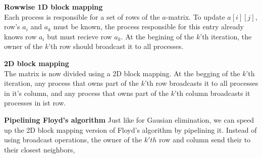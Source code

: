 \documentclass[a4paper,10pt,twoside,twocolumn]{article}
\renewcommand{\(}{\left(}
\renewcommand{\)}{\right)}
\begin{document}
\textbf{Rowwise 1D block mapping} \\
Each process is responsible for a set of rows of the $a$-matrix. To update $a[i][j]$, row's $a_i$ and $a_k$ must be known, the process responsible for this entry already knows row $a_i$ but must recieve row $a_k$. At the begining of the $k$'th iteration, the owner of the $k$'th row should broadcast it to all processes.

\textbf{2D block mapping} \\
The matrix is now divided using a 2D block mapping. At the begging of the $k$'th iteration, any process that owns part of the $k$'th row broadcasts it to all processes in it's column, and any process that owns part of the $k$'th column broadcasts it processes in ist row.

\textbf{Pipelining Floyd's algorithm}
Just like for Gausian elimination, we can speed up the 2D block mapping version of Floyd's algorithm by pipelining it. Instead of using broadcast operations, the owner of the $k'th$ row and column send their to their closest neighbors, 
\end{document}
